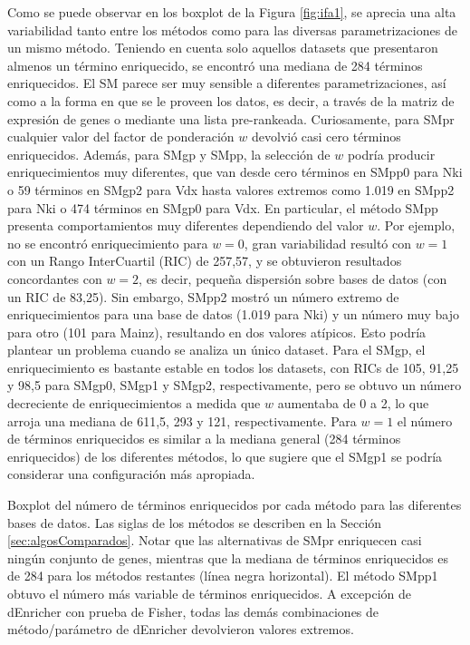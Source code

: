 \documentclass[12pt,twoside]{reedthesis}
\begin{document}
\par

Como se puede observar en los boxplot de la Figura \ref{fig:ifa1}, se aprecia una alta variabilidad tanto entre los métodos como para las diversas parametrizaciones de un mismo método. Teniendo en cuenta solo aquellos datasets que presentaron almenos un término enriquecido, se encontró una mediana de 284 términos enriquecidos. El SM parece ser muy sensible a diferentes parametrizaciones, así como a la forma en que se le proveen los datos, es decir, a través de la matriz de expresión de genes o mediante una lista pre-rankeada. Curiosamente, para SMpr cualquier valor del factor de ponderación \(w\) devolvió casi cero términos enriquecidos. Además, para SMgp y SMpp, la selección de \(w\) podría producir enriquecimientos muy diferentes, que van desde cero términos en SMpp0 para Nki o 59 términos en SMgp2 para Vdx hasta valores extremos como 1.019 en SMpp2 para Nki o 474 términos en SMgp0 para Vdx. En particular, el método SMpp presenta comportamientos muy diferentes dependiendo del valor \(w\). Por ejemplo, no se encontró enriquecimiento para \(w=0\), gran variabilidad resultó con \(w=1\) con un Rango InterCuartil (RIC) de 257,57, y se obtuvieron resultados concordantes con \(w=2\), es decir, pequeña dispersión sobre bases de datos (con un RIC de 83,25). Sin embargo, SMpp2 mostró un número extremo de enriquecimientos para una base de datos (1.019 para Nki) y un número muy bajo para otro (101 para Mainz), resultando en dos valores atípicos. Esto podría plantear un problema cuando se analiza un único dataset. Para el SMgp, el enriquecimiento es bastante estable en todos los datasets, con RICs de 105, 91,25 y 98,5 para SMgp0, SMgp1 y SMgp2, respectivamente, pero se obtuvo un número decreciente de enriquecimientos a medida que \(w\) aumentaba de 0 a 2, lo que arroja una mediana de 611,5, 293 y 121, respectivamente. Para \(w=1\) el número de términos enriquecidos es similar a la mediana general (284 términos enriquecidos) de los diferentes métodos, lo que sugiere que el SMgp1 se podría considerar una configuración más apropiada.

Boxplot del número de términos enriquecidos por cada método para las diferentes bases de datos. Las siglas de los métodos se describen en la Sección \ref{sec:algosComparados}. Notar que las alternativas de SMpr enriquecen casi ningún conjunto de genes, mientras que la mediana de términos enriquecidos es de 284 para los métodos restantes (línea negra horizontal). El método SMpp1 obtuvo el número más variable de términos enriquecidos. A excepción de dEnricher con prueba de Fisher, todas las demás combinaciones de método/parámetro de dEnricher devolvieron valores extremos.
\end{document}
